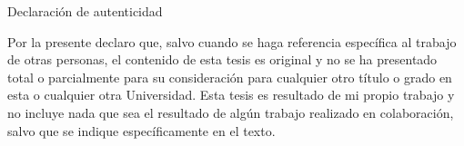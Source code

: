 
\begin{prologo}{Declaración de autenticidad}

Por la presente declaro que, salvo cuando se haga referencia específica al trabajo de otras personas, el contenido de esta tesis es original y no se ha presentado total o parcialmente para su consideración para cualquier otro título o grado en esta o cualquier otra Universidad. Esta tesis es resultado de mi propio trabajo y no incluye nada que sea el resultado de algún trabajo realizado en colaboración, salvo que se indique específicamente en el texto. 

\end{prologo}
